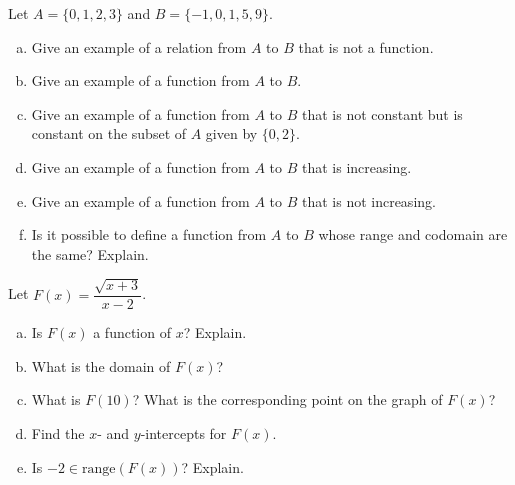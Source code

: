 \documentclass[11pt,letterpaper]{article}
\begin{document}
\prob Let $A= \{ 0, 1, 2, 3 \}$ and $B= \{ -1, 0, 1, 5, 9 \}$. 
	\begin{enumerate}[(a)]
	\item Give an example of a relation from $A$ to $B$ that is not a function. 
	\item Give an example of a function from $A$ to $B$. 
	\item Give an example of a function from $A$ to $B$ that is not constant but is constant on the subset of $A$ given by $\{ 0, 2 \}$. 
	\item Give an example of a function from $A$ to $B$ that is increasing. 
	\item Give an example of a function from $A$ to $B$ that is not increasing. 
	\item Is it possible to define a function from $A$ to $B$ whose range and codomain are the same? Explain. 
	\end{enumerate} \pspace



\prob Let $F(x)= \dfrac{\sqrt{x + 3}}{x - 2}$. 
	\begin{enumerate}[(a)]
	\item Is $F(x)$ a function of $x$? Explain. 
	\item What is the domain of $F(x)$?
	\item What is $F(10)$? What is the corresponding point on the graph of $F(x)$?
	\item Find the $x$- and $y$-intercepts for $F(x)$. 
	\item Is $-2 \in \text{range} \left( F(x) \right)$? Explain. 
	\end{enumerate}
\end{document}
